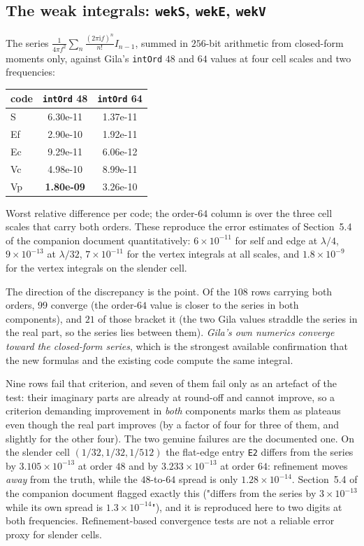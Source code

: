 \documentclass[11pt]{article}
\theoremstyle{remark}
\newcommand{\ii}{\mathrm{i}}
\newcommand{\code}[1]{\texttt{#1}}
\begin{document}
\subsection{The weak integrals: \code{wekS}, \code{wekE}, \code{wekV}}

The series $\frac{1}{4\pi f^2}\sum_n\frac{(2\pi\ii f)^n}{n!}I_{n-1}$, summed in $256$-bit
arithmetic from closed-form moments only, against Gila's \code{intOrd} $48$ and $64$ values
at four cell scales and two frequencies:

\begin{center}\small
\begin{tabular}{@{}lcc@{}}
\toprule
code & \code{intOrd} 48 & \code{intOrd} 64\\
\midrule
S  & 6.30e-11 & 1.37e-11\\
Ef & 2.90e-10 & 1.92e-11\\
Ec & 9.29e-11 & 6.06e-12\\
Vc & 4.98e-10 & 8.99e-11\\
Vp & \textbf{1.80e-09} & 3.26e-10\\
\bottomrule
\end{tabular}
\end{center}
\noindent
Worst relative difference per code; the order-$64$ column is over the three cell scales
that carry both orders. These reproduce the error estimates of Section~5.4 of the companion
document quantitatively: $6\times10^{-11}$ for self and edge at $\lambda/4$,
$9\times10^{-13}$ at $\lambda/32$, $7\times10^{-11}$ for the vertex integrals at all
scales, and $1.8\times10^{-9}$ for the vertex integrals on the slender cell.

The direction of the discrepancy is the point. Of the $108$ rows carrying both orders,
$99$ converge (the order-$64$ value is closer to the series in both components), and $21$
of those bracket it (the two Gila values straddle the series in the real part, so the
series lies between them). \emph{Gila's own numerics converge toward the closed-form
series}, which is the strongest available confirmation that the new formulas and the
existing code compute the same integral.

Nine rows fail that criterion, and seven of them fail only as an artefact of the test:
their imaginary parts are already at round-off and cannot improve, so a criterion
demanding improvement in \emph{both} components marks them as plateaus even though the real
part improves (by a factor of four for three of them, and slightly for the other four).
The two genuine failures are the documented one. On the slender cell
$(1/32,1/32,1/512)$ the flat-edge entry \code{E2} differs from the series by
$3.105\times10^{-13}$ at order $48$ and by $3.233\times10^{-13}$ at order $64$: refinement
moves \emph{away} from the truth, while the $48$-to-$64$ spread is only
$1.28\times10^{-14}$. Section~5.4 of the companion document flagged exactly this
("differs from the series by $3\times10^{-13}$ while its own spread is
$1.3\times10^{-14}$"), and it is reproduced here to two digits at both frequencies.
Refinement-based convergence tests are not a reliable error proxy for slender cells.
\end{document}

